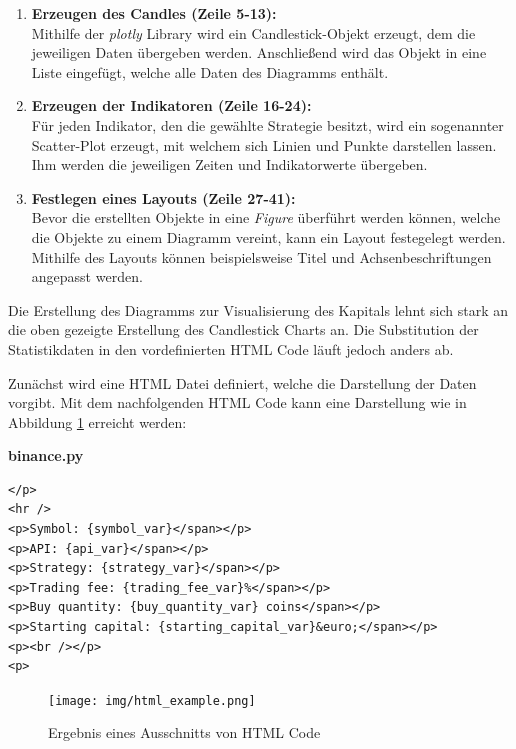 \documentclass[oneside]{ausarbeitung}
\begin{document}
\begin{enumerate}
	\item \textbf{Erzeugen des Candles (Zeile 5-13):} \\
		Mithilfe der \textit{plotly} Library wird ein Candlestick-Objekt erzeugt,
		dem die jeweiligen Daten übergeben werden. Anschließend wird das
		Objekt in eine Liste eingefügt, welche alle Daten des Diagramms enthält.
	\item \textbf{Erzeugen der Indikatoren (Zeile 16-24):} \\
		Für jeden Indikator, den die gewählte Strategie besitzt, wird ein 
		sogenannter Scatter-Plot erzeugt, mit welchem sich Linien und Punkte
		darstellen lassen. Ihm werden die jeweiligen Zeiten und Indikatorwerte
		übergeben.
	\item \textbf{Festlegen eines Layouts (Zeile 27-41):} \\
		Bevor die erstellten Objekte in eine \textit{Figure} überführt werden
		können, welche die Objekte zu einem Diagramm vereint, kann ein Layout
		festegelegt werden. Mithilfe des Layouts können beispielsweise Titel und
		Achsenbeschriftungen angepasst werden.
\end{enumerate}

Die Erstellung des Diagramms zur Visualisierung des Kapitals lehnt sich stark an die oben gezeigte Erstellung des Candlestick Charts an. Die Substitution der Statistikdaten in den vordefinierten HTML Code läuft jedoch anders ab.

Zunächst wird eine HTML Datei definiert, welche die Darstellung der Daten vorgibt.
Mit dem nachfolgenden HTML Code kann eine Darstellung wie in Abbildung \ref{fig:19} erreicht werden:

\lstset{language=HTML}
\lstset{frame=lines}
\lstset{basicstyle=\footnotesize}
\textbf{binance.py}
\begin{lstlisting}
</p>
<hr />
<p>Symbol: {symbol_var}</span></p>
<p>API: {api_var}</span></p>
<p>Strategy: {strategy_var}</span></p>
<p>Trading fee: {trading_fee_var}%</span></p>
<p>Buy quantity: {buy_quantity_var} coins</span></p>
<p>Starting capital: {starting_capital_var}&euro;</span></p>
<p><br /></p>
<p>
\end{lstlisting}

\begin{figure}[H]
  \centering
  \texttt{[image: img/html\_example.png]}
  \caption{Ergebnis eines Ausschnitts von HTML Code}
  \label{fig:19}
\end{figure}
\end{document}
